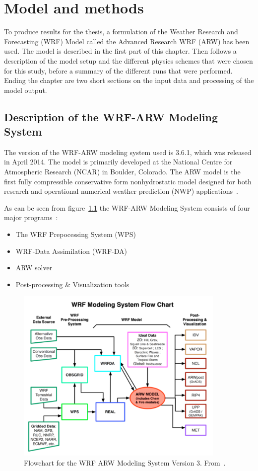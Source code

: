\chapter{Model and methods}
\label{chap:modmet}
To produce results for the thesis, a formulation of the Weather Research and Forecasting (WRF) Model called the Advanced Research WRF (ARW) has been used. The model is described in the first part of this chapter. Then follows a description of the model setup and the different physics schemes that were chosen for this study, before a summary of the different runs that were performed. Ending the chapter are two short sections on the input data and processing of the model output.
\section{Description of the WRF-ARW Modeling System}
\label{sec:modeldes}
The version of the WRF-ARW modeling system used is 3.6.1, which was released in April 2014. The model is primarily developed at the National Centre for Atmospheric Research (NCAR) in Boulder, Colorado. The ARW model is the first fully compressible conservative form nonhydrostatic model designed for both research and operational numerical weather prediction (NWP) applications~\citep{Skamarock2008}. 

As can be seen from figure~\ref{fig:wrfflowchart} the WRF-ARW Modeling System consists of four major programs~\citep{Wang2015}:
\begin{itemize}
\item The WRF Prepocessing System (WPS)
\item WRF-Data Assimilation (WRF-DA)
\item ARW solver
\item Post-processing \& Visualization tools
\end{itemize}

\begin{figure}
\centering
\includegraphics[width=0.9\textwidth]{model_methods/wrfflowchart}
\caption{Flowchart for the WRF ARW Modeling System Version 3. From~\citet{Wang2015}.}
\label{fig:wrfflowchart}
\end{figure}

